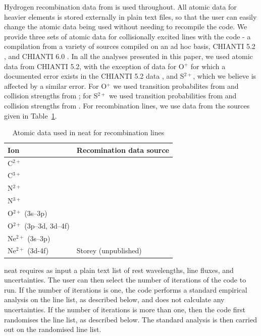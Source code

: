 \documentclass[useAMS,usenatbib]{mn2e}
\begin{document}
Hydrogen recombination data from \citet{1995MNRAS.272...41S} is used throughout.  All atomic data for heavier elements is stored externally in plain text files, so that the user can easily change the atomic data being used without needing to recompile the code.  We provide three sets of atomic data for collisionally excited lines with the code - a compilation from a variety of sources compiled on an ad hoc basis, CHIANTI 5.2 \citep{2006ApJS..162..261L}, and CHIANTI 6.0 \citep{2009A&A...498..915D}.  In all the analyses presented in this paper, we used atomic data from CHIANTI 5.2, with the exception of data for O$^{+}$ for which a documented error exists in the CHIANTI 5.2 data \citep{2009MNRAS.397..903K}, and S$^{2+}$, which we believe is affected by a similar error.  For O$^{+}$ we used transition probabilites from \citet{1982MNRAS.198..111Z} and collision strengths from \citet{1976MNRAS.177...31P}; for S$^{2+}$ we used transition probabilities from \citet{1982MNRAS.199.1025M} and collision strengths from \citet{1983IAUS..103..143M}.  For recombination lines, we use data from the sources given in Table~\ref{RL_atomic_data}.

\begin{table}
\begin{tabular}{ll}
\hline
Ion & Recomination data source \\
\hline
C$^{2+}$ & \citet{2000AAS..142...85D} \\
C$^{3+}$ & \citet{1991AA...251..680P} \\
N$^{2+}$ & \citet{1990ApJS...73..513E} \\
N$^{3+}$ & \citet{1991AA...251..680P} \\
O$^{2+}$ (3s--3p) & \citet{1994AA...282..999S} \\
O$^{2+}$ (3p--3d, 3d--4f) & \citet{1995MNRAS.272..369L} \\
Ne$^{2+}$ (3s--3p)& \citet{1998AAS..133..257K} \\
Ne$^{2+}$ (3d-4f) & Storey (unpublished) \\
\hline
\end{tabular}
\label{RL_atomic_data}
\caption{Atomic data used in {\sc neat} for recombination lines}
\end{table}

{\sc neat} requires as input a plain text list of rest wavelengths, line fluxes, and uncertainties.  The user can then select the number of iterations of the code to run.  If the number of iterations is one, the code performs a standard empirical analysis on the line list, as described below, and does not calculate any uncertainties.  If the number of iterations is more than one, then the code first randomises the line list, as described below.  The standard analysis is then carried out on the randomised line list.
\end{document}
